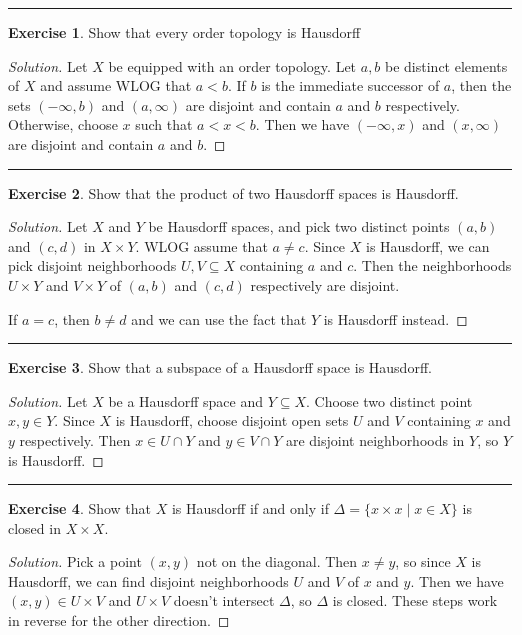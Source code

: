 \documentclass{article}
\theoremstyle{definition}
\newtheorem{exercise}{Exercise}[section]
\begin{document}
\hrule

\begin{exercise}
  Show that every order topology is Hausdorff
\end{exercise}
\begin{proof}[Solution]
  Let $X$ be equipped with an order topology. Let $a,b$ be distinct elements of $X$ and assume WLOG that $a < b$. If $b$ is the immediate successor of $a$, then the sets $(-\infty,b)$ and $(a,\infty)$ are disjoint and contain $a$ and $b$ respectively. Otherwise, choose $x$ such that $a < x < b$. Then we have $(-\infty,x)$ and $(x,\infty)$ are disjoint and contain $a$ and $b$.
\end{proof}

\hrule

\begin{exercise}
  Show that the product of two Hausdorff spaces is Hausdorff.
\end{exercise}
\begin{proof}[Solution]
  Let $X$ and $Y$ be Hausdorff spaces, and pick two distinct points $(a,b)$ and $(c,d)$ in $X\times Y$. WLOG assume that $a\ne c$. Since $X$ is Hausdorff, we can pick disjoint neighborhoods $U,V\subseteq X$ containing $a$ and $c$. Then the neighborhoods $U\times Y$ and $V\times Y$ of $(a,b)$ and $(c,d)$ respectively are disjoint.

  If $a = c$, then $b\ne d$ and we can use the fact that $Y$ is Hausdorff instead.
\end{proof}

\hrule

\begin{exercise}
  Show that a subspace of a Hausdorff space is Hausdorff.
\end{exercise}
\begin{proof}[Solution]
  Let $X$ be a Hausdorff space and $Y\subseteq X$. Choose two distinct point $x,y\in Y$. Since $X$ is Hausdorff, choose disjoint open sets $U$ and $V$ containing $x$ and $y$ respectively. Then $x\in U\cap Y$ and $y\in V\cap Y$ are disjoint neighborhoods in $Y$, so $Y$ is Hausdorff.
\end{proof}

\hrule

\begin{exercise}
  Show that $X$ is Hausdorff if and only if $\Delta = \{x\times x\mid x\in X\}$ is closed in $X\times X$.
\end{exercise}
\begin{proof}[Solution]
  Pick a point $(x,y)$ not on the diagonal. Then $x\ne y$, so since $X$ is Hausdorff, we can find disjoint neighborhoods $U$ and $V$ of $x$ and $y$. Then we have $(x,y)\in U\times V$ and $U\times V$ doesn't intersect $\Delta$, so $\Delta$ is closed. These steps work in reverse for the other direction.
\end{proof}
\end{document}
